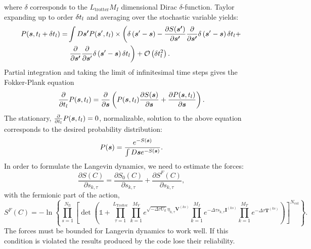where $\delta$ corresponds to the $L_\mathrm{trotter} M_I $  dimensional Dirac $\delta$-function.   Taylor expanding  up to order $\delta t_{l}$  and averaging over the stochastic variable yields:
\begin{align}
P(\boldsymbol{s}, t_{l}  + \delta t_{l} ) =& \int D\boldsymbol{s'}  P  (\boldsymbol{s}', t_{l}  )   \times \left(   \delta \left(  \boldsymbol{s}' - \boldsymbol{s}   \right)
- \frac{\partial S(\boldsymbol{s'}) }{\partial    \boldsymbol{s'} }   \frac{\partial  }{\partial    \boldsymbol{s'} } \delta \left(  \boldsymbol{s}' - \boldsymbol{s} \right)  \delta t_{l}   +   \right. \nonumber   \\
   &\left. \frac{\partial  }{\partial    \boldsymbol{s'} }   \frac{\partial  }{\partial    \boldsymbol{s}' }  \delta \left(  \boldsymbol{s}' - \boldsymbol{s}\right)    \delta t_{l}
\right)  + {\cal O}  \left(  \delta t_{l}^2 \right).
\end{align}
Partial integration  and taking the limit of infinitesimal time steps   gives the Fokker-Plank equation
\begin{equation}
         \frac{\partial  }{\partial   t_{l}}  P( \boldsymbol{s}, t_{l})  =  \frac{\partial  }{\partial    \boldsymbol{s} }  \left( P( \boldsymbol{s}, t_{l})  \frac{\partial S(\boldsymbol{s}) }{\partial     \boldsymbol{s} }   +
          \frac{\partial P(\boldsymbol{s},t_{l}) }{\partial     \boldsymbol{s} }
         \right) .
\end{equation}
The stationary,  $ \frac{\partial  }{\partial   t_{l}}  P( \boldsymbol{s}, t_{l}) =0$,  normalizable,  solution to the above equation corresponds to the desired probability distribution:
\begin{equation}
          P(\boldsymbol{s}) =  \frac{ e^{ - S(\boldsymbol{s}) } }   {   \int D \boldsymbol{s}  e^{ - S(\boldsymbol{s}) } }.
\end{equation}
In order to formulate  the Langevin dynamics, we need to estimate the forces:
\begin{equation}
	\frac { \partial S(C)}{\partial s_{k,\tau} } =\frac { \partial S_0(C)}{\partial s_{k,\tau} } +  \frac { \partial S^F(C)}{\partial s_{k,\tau} },
\end{equation}
with the fermionic part of the action,
\begin{equation}
S^F(C) = - \ln{ \left\{
  \prod_{s=1}^{N_{\mathrm{fl}}}\left[\det\left(  \mathds{1} + 
     \prod_{\tau=1}^{L_{\mathrm{Trotter}}}   
 \prod_{k=1}^{M_V}   e^{  \sqrt{ -\Delta \tau  U_k} \eta_{k,\tau} {\bm V}^{(ks)} }   \prod_{k=1}^{M_I}   e^{  -\Delta \tau s_{k,\tau}  {\bm I}^{(ks)}}  
     \prod_{k=1}^{M_T}   e^{-\Delta \tau {\bm T}^{(ks)}} 
     \right) \right]^{N_{\mathrm{col}}} \right\}} .
\end{equation} 
The forces must be bounded for Langevin dynamics to work well. If this condition is violated the results produced by the code lose their reliability. 

